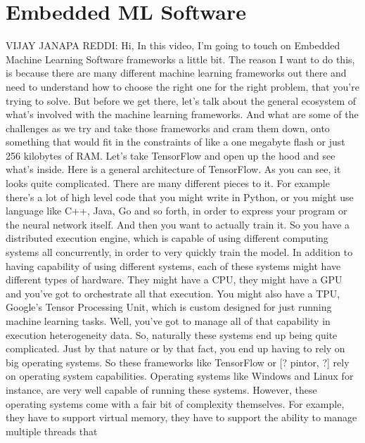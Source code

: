 \section{Embedded ML Software}

    
    VIJAY JANAPA REDDI: Hi, In this video, I'm
    going to touch on Embedded Machine Learning Software
    frameworks a little bit.
    The reason I want to do this, is because there
    are many different machine learning frameworks out there
    and need to understand how to choose the right one for the right problem,
    that you're trying to solve.
    But before we get there, let's talk about the general ecosystem
    of what's involved with the machine learning frameworks.
    And what are some of the challenges as we try and take those frameworks
    and cram them down, onto something that would
    fit in the constraints of like a one megabyte flash
    or just 256 kilobytes of RAM.
    Let's take TensorFlow and open up the hood and see what's inside.
    Here is a general architecture of TensorFlow.
    As you can see, it looks quite complicated.
    There are many different pieces to it.
    For example there's a lot of high level code that you might write in Python,
    or you might use language like C++, Java, Go and so forth,
    in order to express your program or the neural network itself.
    And then you want to actually train it.
    So you have a distributed execution engine,
    which is capable of using different computing systems all concurrently,
    in order to very quickly train the model.
    In addition to having capability of using different systems,
    each of these systems might have different types of hardware.
    They might have a CPU, they might have a GPU
    and you've got to orchestrate all that execution.
    You might also have a TPU, Google's Tensor Processing
    Unit, which is custom designed for just running machine learning tasks.
    Well, you've got to manage all of that capability in execution heterogeneity
    data.
    So, naturally these systems end up being quite complicated.
    Just by that nature or by that fact, you end up
    having to rely on big operating systems.
    So these frameworks like TensorFlow or [? pintor, ?]
    rely on operating system capabilities.
    Operating systems like Windows and Linux for instance,
    are very well capable of running these systems.
    However, these operating systems come with a fair bit of complexity
    themselves.
    For example, they have to support virtual memory,
    they have to support the ability to manage multiple threads that
